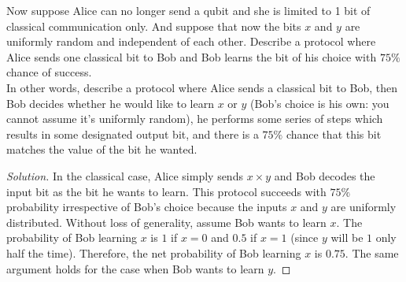 \begin{solution}[label=ques:1b]
  \begin{question}
    Now suppose Alice can no longer send a qubit and she is limited to 1 bit of classical communication only. And
    suppose that now the bits $x$ and $y$ are uniformly random and independent of each other.  
    Describe a protocol where Alice sends one classical bit to Bob and Bob learns the bit of his choice with $75\%$ chance of success.
    \\ In other words, describe a protocol where Alice sends a classical bit to Bob, then Bob decides whether he would like to learn $x$ or $y$ (Bob's choice is his own: you cannot assume it's uniformly random), he performs some series of steps which results in some designated output bit, and there is a $75\%$ chance that this bit matches the value of the bit he wanted.
  \end{question}
  \tcblower{}
  \begin{proof}[Solution]
    In the classical case, Alice simply sends $x\times y$ and Bob decodes the input bit as the bit he wants to learn. This protocol succeeds with $75\%$ probability irrespective of Bob's choice because the inputs $x$ and $y$ are uniformly distributed. Without loss of generality, assume Bob wants to learn $x$. The probability of Bob learning $x$ is $1$ if $x = 0$ and $0.5$ if $x = 1$ (since $y$ will be $1$ only half the time). Therefore, the net probability of Bob learning $x$ is $0.75$. The same argument holds for the case when Bob wants to learn $y$.
  \end{proof}
\end{solution}
